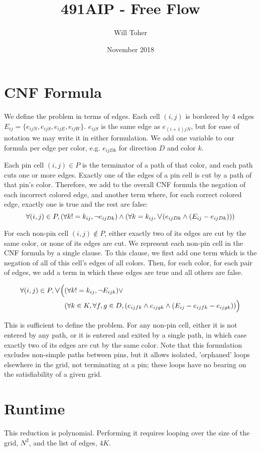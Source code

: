 \documentclass{article}
\title{491AIP - Free Flow}
\author{Will Toher}
\date{November 2018}
\begin{document}
\maketitle

\section{CNF Formula}

We define the problem in terms of edges. Each cell $(i,j)$ is bordered by 4 edges $ E_{ij} = \{ e_{ijN}, e_{ijS}, e_{ijE}, e_{ijW} \}$. $e_{ijS}$ is the same edge as $e_{(i+1)jN}$, but for ease of notation we may write it in either formulation. We add one variable to our formula per edge per color, e.g. $e_{ijDk}$ for direction $D$ and color $k$.

Each pin cell $(i,j) \in P$ is the terminator of a path of that color, and each path cuts one or more edges. Exactly one of the edges of a pin cell is cut by a path of that pin's color. Therefore, we add to the overall CNF formula the negation of each incorrect colored edge, and another term where, for each correct colored edge, exactly one is true and the rest are false:
$$ \forall (i,j) \in P, (\forall k != k_{ij}, \neg e_{ijDk}) \land (\forall k = k_{ij}, \mathlarger{\lor} (e_{ijDk} \land (E_{ij} - e_{ijDk}))) $$

For each non-pin cell $(i,j) \notin P$, either exactly two of its edges are cut by the same color, or none of its edges are cut.
We represent each non-pin cell in the CNF formula by a single clause.
To this clause, we first add one term which is the negation of all of this cell's edges of all colors.
Then, for each color, for each pair of edges, we add a term in which these edges are true and all others are false.

\begin{align*}
\forall (i,j) \in P, \mathlarger{\lor} \Big(&(\forall k != k_{ij}, \neg E_{ijk}) \lor \\
&(\forall k \in K, \forall f,g \in D,   (e_{ijfk} \land e_{ijgk} \land (E_{ij} - e_{ijfk} - e_{ijgk}))\Big)
\end{align*}

This is sufficient to define the problem. For any non-pin cell, either it is not entered by any path, or it is entered and exited by a single path, in which case exactly two of its edges are cut by the same color.
Note that this formulation excludes non-simple paths between pins, but it allows isolated, 'orphaned' loops elsewhere in the grid, not terminating at a pin; these loops have no bearing on the satisfiability of a given grid.

\section{Runtime}
This reduction is polynomial. Performing it requires looping over the size of the grid, $N^2$, and the list of edges, $4K$.

\section{}
\end{document}
